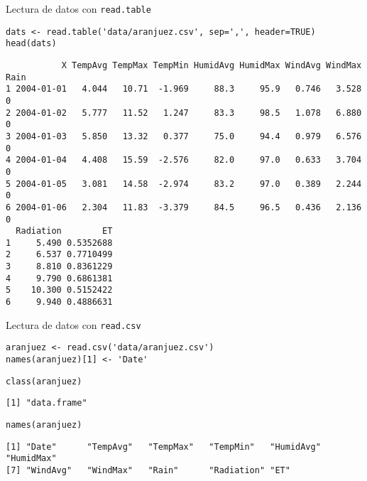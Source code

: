 \documentclass[xcolor={usenames,svgnames,dvipsnames}]{beamer}
\begin{document}
\begin{frame}[fragile,label={sec:org571387a}]{Lectura de datos con \texttt{read.table}}
 \lstset{language=r,label= ,caption= ,captionpos=b,numbers=none}
\begin{lstlisting}
dats <- read.table('data/aranjuez.csv', sep=',', header=TRUE)
head(dats)
\end{lstlisting}

\begin{verbatim}
           X TempAvg TempMax TempMin HumidAvg HumidMax WindAvg WindMax Rain
1 2004-01-01   4.044   10.71  -1.969     88.3     95.9   0.746   3.528    0
2 2004-01-02   5.777   11.52   1.247     83.3     98.5   1.078   6.880    0
3 2004-01-03   5.850   13.32   0.377     75.0     94.4   0.979   6.576    0
4 2004-01-04   4.408   15.59  -2.576     82.0     97.0   0.633   3.704    0
5 2004-01-05   3.081   14.58  -2.974     83.2     97.0   0.389   2.244    0
6 2004-01-06   2.304   11.83  -3.379     84.5     96.5   0.436   2.136    0
  Radiation        ET
1     5.490 0.5352688
2     6.537 0.7710499
3     8.810 0.8361229
4     9.790 0.6861381
5    10.300 0.5152422
6     9.940 0.4886631
\end{verbatim}
\end{frame}

\begin{frame}[fragile,label={sec:org81f8f7d}]{Lectura de datos con \texttt{read.csv}}
 \lstset{language=r,label= ,caption= ,captionpos=b,numbers=none}
\begin{lstlisting}
aranjuez <- read.csv('data/aranjuez.csv')
names(aranjuez)[1] <- 'Date'
\end{lstlisting}

\lstset{language=r,label= ,caption= ,captionpos=b,numbers=none}
\begin{lstlisting}
class(aranjuez)
\end{lstlisting}

\begin{verbatim}
[1] "data.frame"
\end{verbatim}

\lstset{language=r,label= ,caption= ,captionpos=b,numbers=none}
\begin{lstlisting}
names(aranjuez)
\end{lstlisting}

\begin{verbatim}
[1] "Date"      "TempAvg"   "TempMax"   "TempMin"   "HumidAvg"  "HumidMax" 
[7] "WindAvg"   "WindMax"   "Rain"      "Radiation" "ET"
\end{verbatim}
\end{frame}
\end{document}
